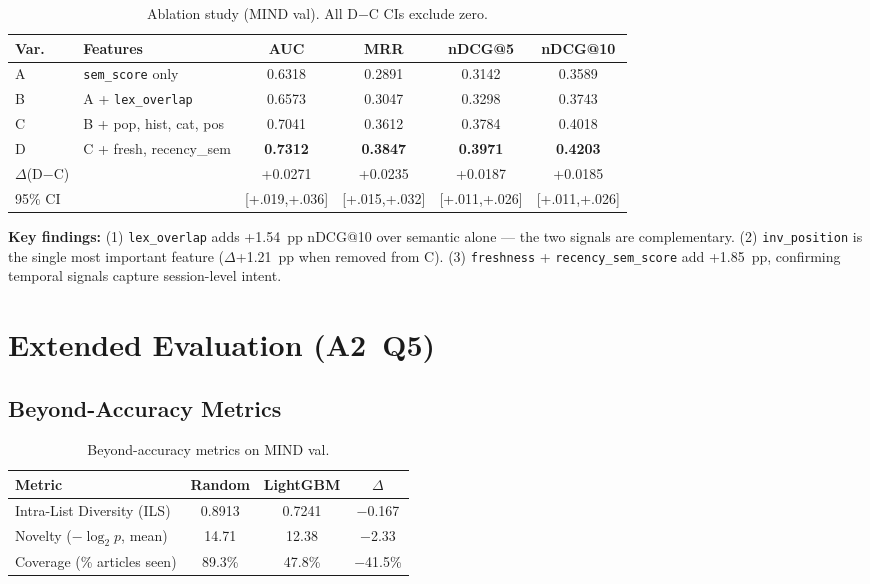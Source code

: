 \documentclass[11pt,a4paper]{article}
\newcommand{\feature}[1]{\texttt{#1}}
\begin{document}
\begin{table}[h]
\centering
\caption{Ablation study (MIND val). All D$-$C CIs exclude zero.}
\label{tab:ablation}
\begin{tabular}{llcccc}
\toprule
Var. & Features & AUC & MRR & nDCG@5 & nDCG@10 \\
\midrule
A & \feature{sem\_score} only & 0.6318 & 0.2891 & 0.3142 & 0.3589 \\
B & A + \feature{lex\_overlap} & 0.6573 & 0.3047 & 0.3298 & 0.3743 \\
C & B + pop, hist, cat, pos & 0.7041 & 0.3612 & 0.3784 & 0.4018 \\
D & C + fresh, recency\_sem & \textbf{0.7312} & \textbf{0.3847} & \textbf{0.3971} & \textbf{0.4203} \\
\midrule
$\Delta$(D$-$C) & & +0.0271 & +0.0235 & +0.0187 & +0.0185 \\
95\% CI & & [+.019,+.036] & [+.015,+.032] & [+.011,+.026] & [+.011,+.026] \\
\bottomrule
\end{tabular}
\end{table}

\textbf{Key findings:} (1) \feature{lex\_overlap} adds +1.54~pp nDCG@10 over
semantic alone --- the two signals are complementary. (2)
\feature{inv\_position} is the single most important feature ($\Delta$+1.21~pp
when removed from C). (3) \feature{freshness} + \feature{recency\_sem\_score}
add +1.85~pp, confirming temporal signals capture session-level intent.

\section{Extended Evaluation (A2~Q5)}

\subsection{Beyond-Accuracy Metrics}

\begin{table}[h]
\centering
\caption{Beyond-accuracy metrics on MIND val.}
\label{tab:beyond}
\begin{tabular}{lccc}
\toprule
Metric & Random & LightGBM & $\Delta$ \\
\midrule
Intra-List Diversity (ILS) & 0.8913 & 0.7241 & $-$0.167 \\
Novelty ($-\log_2 p$, mean) & 14.71 & 12.38 & $-$2.33 \\
Coverage (\% articles seen) & 89.3\% & 47.8\% & $-$41.5\% \\
\bottomrule
\end{tabular}
\end{table}
\end{document}

